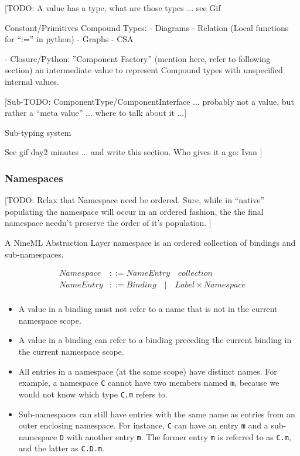 \documentclass[a4paper]{article}
\begin{document}
[TODO: A value has a type, what are those types ... see Gif 

Constant/Primitives
Compound Types:
- Diagrams
- Relation (Local functions for ``:='' in python)
- Graphs
- CSA

- Closure/Python: ''Component Factory'' (mention here, refer to following section)
  an intermediate value to represent Compound types with 
  unspecified internal values.


[Sub-TODO: ComponentType/ComponentInterface ... probably not a
value, but rather a ``meta value'' ... where to talk about it ...]


Sub-typing system

See gif day2 minutes ... and write this section.
Who gives it a go: Ivan
]

\subsubsection{Namespaces}

[TODO: Relax that Namespace need be ordered.  Sure, while in ``native'' populating 
the namespace will occur in an ordered fashion, the the final namespace
needn't preserve the order of it's population. ] 

A NineML Abstraction Layer namespace is an ordered collection of
bindings and sub-namespaces. 

\begin{equation*}
\begin{array}{ll}
   Namespace & ::= NameEntry \quad collection \\
   NameEntry & ::= Binding \quad  \lvert \quad Label \times Namespace \\
\end{array}
\end{equation*}

\begin{itemize}
\item A value in a binding must not refer to a name that is not in the
  current namespace scope.
\item A value in a binding can refer to a binding preceding the current binding in the
  current namespace scope.
\item All entries in a namespace (at the same scope) have distinct
  names. For example, a namespace \verb^C^ cannot have two members
  named \verb^m^, because we would not know which type \verb^C.m^
  refers to.
\item Sub-namespaces can still have entries with the same name as
  entries from an outer enclosing namespace. For instance, \verb^C^
  can have an entry \verb^m^ and a sub-namespace \verb^D^ with another
  entry \verb^m^.  The former entry \verb^m^ is referred to as
  \verb^C.m^, and the latter as \verb^C.D.m^.
\end{itemize}
\end{document}

